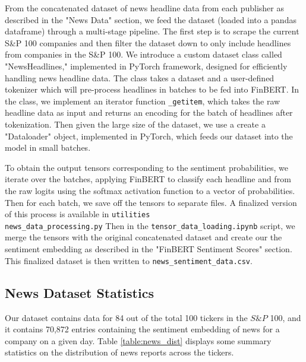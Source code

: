 From the concatenated dataset of news headline data from each publisher as described in the "News Data" section, we feed the dataset (loaded into a pandas dataframe) through a multi-stage pipeline. 
The first step is to scrape the current S\&P 100 companies and then filter the dataset down to only include headlines from companies in the S\&P 100. 
We introduce a custom dataset class called "NewsHeadlines," implemented in PyTorch framework, designed for efficiently handling news headline data. 
The class takes a dataset and a user-defined tokenizer which will pre-process headlines in batches to be fed into FinBERT. 
In the class, we implement an iterator function \texttt{\_getitem}, which takes the raw headline data as input and returns an encoding for the batch of headlines after tokenization. 
Then given the large size of the dataset, we use a create a "Dataloader" object, implemented in PyTorch, which feeds our dataset into the model in small batches. 

To obtain the output tensors corresponding to the sentiment probabilities, we iterate over the batches, applying FinBERT to classify each headline and from the raw logits using the softmax activation function to a vector of probabilities.
Then for each batch, we save off the tensors to separate files. A finalized version of this process is available in \texttt{utilities\\news\_data\_processing.py}
Then in the \texttt{tensor\_data\_loading.ipynb} script, we merge the tensors with the original concatenated dataset and create our the sentiment embedding as described in the "FinBERT Sentiment Scores" section. 
This finalized dataset is then written to \texttt{news\_sentiment\_data.csv}.

\subsection{News Dataset Statistics}\label{newsstats}

Our dataset contains data for 84 out of the total 100 tickers in the $S\&P$ 100,
and it contains 70,872 entries containing the sentiment embedding of news for a company on a given day.
Table \ref{table:news_dist} displays some  summary statistics on the distribution of news reports across the tickers.

